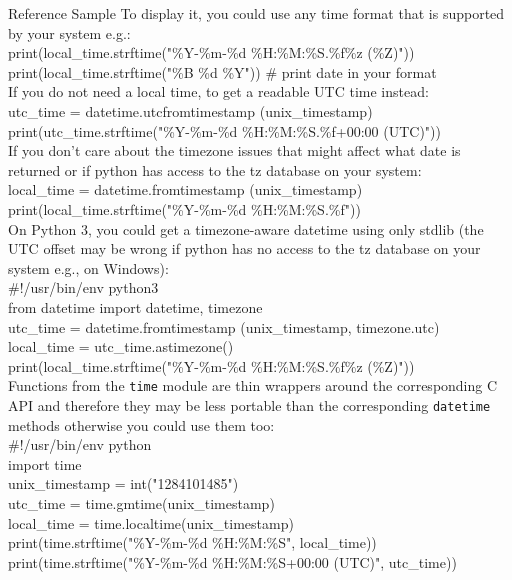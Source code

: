 \begin{promptbox}{Reference Sample}
To display it, you could use any time format that is supported by your system e.g.:\\

print(local\_time.strftime("\%Y-\%m-\%d \%H:\%M:\%S.\%f\%z (\%Z)"))\\
print(local\_time.strftime("\%B \%d \%Y"))  \# print date in your format\\

If you do not need a local time, to get a readable UTC time instead:\\

utc\_time = datetime.utcfromtimestamp (unix\_timestamp)\\
print(utc\_time.strftime("\%Y-\%m-\%d \%H:\%M:\%S.\%f+00:00 (UTC)"))\\ 

If you don't care about the timezone issues that might affect what date is returned or if python has access to the tz database on your system:\\

local\_time = datetime.fromtimestamp (unix\_timestamp)\\
print(local\_time.strftime("\%Y-\%m-\%d \%H:\%M:\%S.\%f"))\\

On Python 3, you could get a timezone-aware datetime using only stdlib (the UTC offset may be wrong if python has no access to the tz database on your system e.g., on Windows):\\

\#!/usr/bin/env python3\\
from datetime import datetime, timezone\\
utc\_time = datetime.fromtimestamp (unix\_timestamp, timezone.utc)\\
local\_time = utc\_time.astimezone()\\
print(local\_time.strftime("\%Y-\%m-\%d \%H:\%M:\%S.\%f\%z (\%Z)"))\\

Functions from the \texttt{time} module are thin wrappers around the corresponding C API and therefore they may be less portable than the corresponding \texttt{datetime} methods otherwise you could use them too:\\

\#!/usr/bin/env python\\
import time\\
unix\_timestamp  = int("1284101485")\\
utc\_time = time.gmtime(unix\_timestamp)\\
local\_time = time.localtime(unix\_timestamp)\\
print(time.strftime("\%Y-\%m-\%d \%H:\%M:\%S", local\_time))\\
print(time.strftime("\%Y-\%m-\%d \%H:\%M:\%S+00:00 (UTC)", utc\_time))



\end{promptbox}

